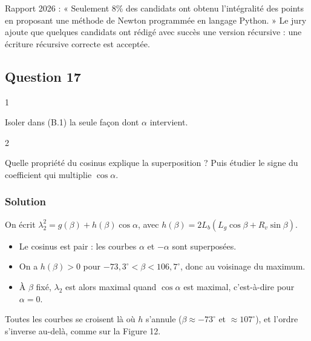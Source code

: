 \documentclass[11pt,a4paper]{article}
\providecommand{\tightlist}{\setlength{\itemsep}{0pt}\setlength{\parskip}{0pt}}
\begin{document}
\begin{jury}

Rapport 2026 : « Seulement 8\% des candidats ont obtenu l'intégralité des points en proposant une méthode de Newton programmée en langage Python. » Le jury ajoute que quelques candidats ont rédigé avec succès une version récursive : une écriture récursive correcte est acceptée.

\end{jury}

\hypertarget{question-17}{%
\subsection{Question 17}\label{question-17}}

\begin{indication}{1}

Isoler dans (B.1) la seule façon dont \(\alpha\) intervient.

\end{indication}

\begin{indication}{2}

Quelle propriété du cosinus explique la superposition ? Puis étudier le signe du coefficient qui multiplie \(\cos\alpha\).

\end{indication}

\hypertarget{solution-16}{%
\subsubsection{Solution}\label{solution-16}}

On écrit \(\lambda_2^2=g(\beta)+h(\beta)\cos\alpha\), avec \(h(\beta)=2L_b(L_g\cos\beta+R_v\sin\beta)\).

\begin{itemize}
\tightlist
\item
  Le cosinus est pair : les courbes \(\alpha\) et \(-\alpha\) sont superposées.
\item
  On a \(h(\beta)>0\) pour \(-73{,}3^\circ<\beta<106{,}7^\circ\), donc au voisinage du maximum.
\item
  À \(\beta\) fixé, \(\lambda_2\) est alors maximal quand \(\cos\alpha\) est maximal, c'est-à-dire pour \(\alpha=0\).
\end{itemize}

Toutes les courbes se croisent là où \(h\) s'annule (\(\beta\approx-73^\circ\) et \(\approx107^\circ\)), et l'ordre s'inverse au-delà, comme sur la Figure 12.
\end{document}
